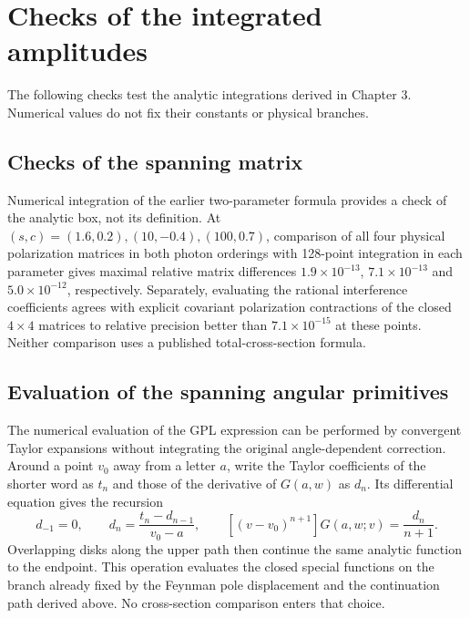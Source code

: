 \section{Checks of the integrated amplitudes}
The following checks test the analytic integrations derived in Chapter 3.
Numerical values do not fix their constants or physical branches.

\subsection{Checks of the spanning matrix}
Numerical integration of the earlier two-parameter formula provides
a check of the analytic box, not its definition. At
$(s,c)=(1.6,0.2),(10,-0.4),(100,0.7)$, comparison of all
four physical polarization matrices in both photon orderings with
128-point integration in each parameter gives maximal relative
matrix differences $1.9\times10^{-13}$,
$7.1\times10^{-13}$ and $5.0\times10^{-12}$, respectively.
Separately, evaluating the rational interference coefficients
agrees with explicit covariant polarization contractions of the
closed $4\times4$ matrices to relative precision better than
$7.1\times10^{-15}$ at these points. Neither comparison uses a
published total-cross-section formula.

\subsection{Evaluation of the spanning angular primitives}
The numerical evaluation of the GPL expression can be performed
by convergent Taylor expansions without integrating the original
angle-dependent correction. Around a point $v_0$ away from a
letter $a$, write the Taylor coefficients of the shorter word
as $t_n$ and those of the derivative of $G(a,w)$ as $d_n$.
Its differential equation gives the recursion
\begin{equation}
 d_{-1}=0,\qquad
 d_n=\frac{t_n-d_{n-1}}{v_0-a},\qquad
 [ (v-v_0)^{n+1}]G(a,w;v)=\frac{d_n}{n+1}.
\end{equation}
Overlapping disks along the upper path then continue the same
analytic function to the endpoint. This operation evaluates the closed special functions on the
branch already fixed by the Feynman pole displacement and the
continuation path derived above. No cross-section comparison
enters that choice.

